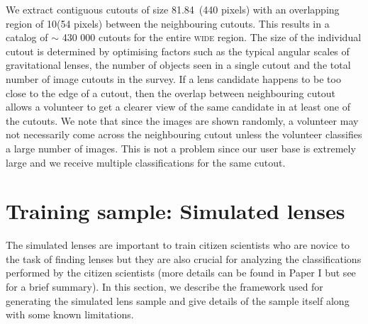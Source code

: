 \documentclass[useAMS,usenatbib,a4paper]{mn2e}
\begin{document}
We extract contiguous cutouts of size 81.84\arcsec\ (440 pixels) with an
overlapping region of 10\arcsec (54 pixels) between the neighbouring
cutouts. This  results in a catalog of $\sim$ 430 000 cutouts for the entire \cfhtls
\textsc{wide} region. The size of the individual cutout is determined by
optimising factors such as the typical angular scales of gravitational
lenses, the number of objects seen in a single cutout and the total
number of image cutouts in the survey. If a lens
candidate happens to be too close to the edge of a cutout, then the overlap
between neighbouring cutout allows a volunteer to get a clearer view
of the same candidate in at least one of the cutouts. We note that since
the images are shown randomly, a volunteer may not necessarily come
across the neighbouring cutout unless the volunteer classifies a large
number of images. This is not a problem since our user base is extremely
large and we receive multiple classifications for the same cutout.




\section{Training sample: Simulated lenses}
\label{sec:ts}

The simulated lenses are important to train citizen scientists who are
novice to the task of finding lenses but they are also crucial for
analyzing the classifications performed by the citizen scientists (more
details can be found in Paper I but see  for a brief
summary). In this section, we describe the framework used for generating the
simulated lens sample and give details of the sample itself along with
some known limitations.
\end{document}
